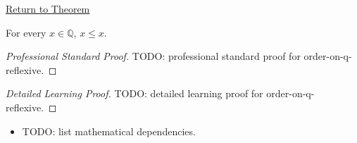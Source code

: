 \newpage
{}
\label{prf:order-on-q-reflexive}

\begin{remark*}[Return]
\hyperref[thm:order-on-q-reflexive]{Return to Theorem}
\end{remark*}

\begin{theorem*}
For every $x\in\mathbb{Q}$, $x\le x$.
\end{theorem*}

\begin{proof}[Professional Standard Proof]
\LRAProofBodyStart
TODO: professional standard proof for order-on-q-reflexive.
\end{proof}

\begin{proof}[Detailed Learning Proof]
\LRAProofBodyStart
TODO: detailed learning proof for order-on-q-reflexive.
\end{proof}

\begin{remark*}
\end{remark*}

\begin{dependencies}
\begin{itemize}
  \item TODO: list mathematical dependencies.
\end{itemize}
\end{dependencies}

\clearpage
